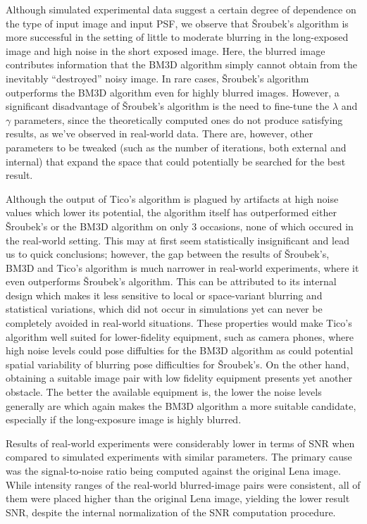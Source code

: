 \documentclass[12pt,notitlepage]{report}
\begin{document}
\clearpage

Although simulated experimental data suggest a certain degree of dependence on the type of input image and input PSF, we observe that Šroubek's algorithm is more successful in the setting of little to moderate blurring in the long-exposed image and high noise in the short exposed image. Here, the blurred image contributes information that the BM3D algorithm simply cannot obtain from the inevitably “destroyed” noisy image. In rare cases, Šroubek's algorithm outperforms the BM3D algorithm even for highly blurred images. However, a significant disadvantage of Šroubek's algorithm is the need to fine-tune the $\lambda$ and $\gamma$ parameters, since the theoretically computed ones do not produce satisfying results, as we've observed in real-world data. There are, however, other parameters to be tweaked (such as the number of iterations, both external and internal) that expand the space that could potentially be searched for the best result. 

Although the output of Tico's algorithm is plagued by artifacts at high noise values which lower its potential, the algorithm itself has outperformed either Šroubek's or the BM3D algorithm on only 3 occasions, none of which occured in the real-world setting. This may at first seem statistically insignificant and lead us to quick conclusions; however, the gap between the results of Šroubek's, BM3D and Tico's algorithm is much narrower in real-world experiments, where it even outperforms Šroubek's algorithm. This can be attributed to its internal design which makes it less sensitive to local or space-variant blurring and statistical variations, which did not occur in simulations yet can never be completely avoided in real-world situations. These properties would make Tico's algorithm well suited for lower-fidelity equipment, such as camera phones, where high noise levels could pose diffulties for the BM3D algorithm as could potential spatial variability of blurring pose difficulties for Šroubek's. On the other hand, obtaining a suitable image pair with low fidelity equipment presents yet another obstacle. The better the available equipment is, the lower the noise levels generally are which again makes the BM3D algorithm a more suitable candidate, especially if the long-exposure image is highly blurred.

Results of real-world experiments were considerably lower in terms of SNR when compared to simulated experiments with similar parameters. The primary cause was the signal-to-noise ratio being computed against the original Lena image. While intensity ranges of the real-world blurred-image pairs were consistent, all of them were placed higher than the original Lena image, yielding the lower result SNR, despite the internal normalization of the SNR computation procedure. 
\end{document}

